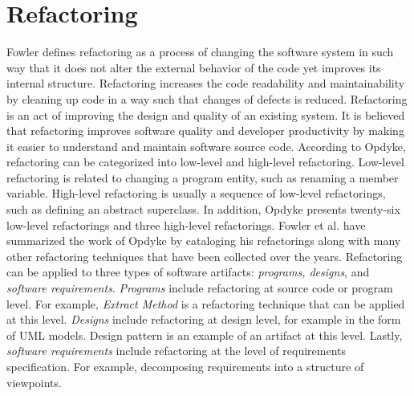 
\section{Refactoring}
\label{sec:refactoring}
Fowler defines refactoring as a process of changing the software system in such way that it does not alter the external behavior of the code yet improves its internal structure\cite{fowler1999refactoring}. Refactoring increases the code readability and maintainability by cleaning up code in a way such that changes of defects is reduced\cite{fowler1999refactoring}. Refactoring is an act of improving the design and quality of an existing system\cite{Vliet:2008:SEP:1481475}. It is believed that refactoring improves software quality and developer productivity by making it easier to understand and maintain software source code\cite{Kim:2012:FSR:2393596.2393655}. According to Opdyke\cite{opdyke1992refactoring}, refactoring can be categorized into low-level and high-level refactoring. Low-level refactoring is related to changing a program entity, such as renaming a member variable. High-level refactoring is usually a sequence of low-level refactorings, such as defining an abstract superclass. In addition, Opdyke presents twenty-six low-level refactorings and three high-level refactorings. Fowler et al.\cite{fowler1999refactoring} have summarized the work of Opdyke by cataloging his refactorings along with many other refactoring techniques that have been collected over the years. Refactoring can be applied to three types of software artifacts: \textit{programs, designs}, and \textit{software requirements}. \textit{Programs} include refactoring at source code or program level. For example, \textit{Extract Method}\cite{fowler1999refactoring} is a refactoring technique that can be applied at this level. \textit{Designs} include refactoring at design level, for example in the form of UML models. Design pattern is an example of an artifact at this level. Lastly, \textit{software requirements} include refactoring at the level of requirements specification. For example, decomposing requirements into a structure of viewpoints.




